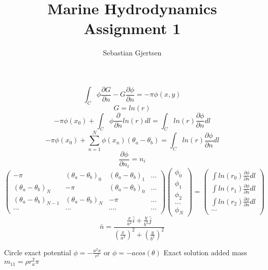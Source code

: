 \documentclass[a4paper,norsk]{article}
\begin{document}
\title{Marine Hydrodynamics \\ Assignment 1}
\author{Sebastian Gjertsen}

\maketitle
\[   \int_C \phi \frac{\partial G }{\partial n} - G\frac{\partial \phi }{\partial n} = -\pi \phi(x,y) \]
\newline
$$ G = ln (r)$$
\newline
$$ -\pi \phi(x_0) + \int_C \phi \frac{\partial }{\partial n} ln(r) dl = \int_C ln(r) \frac{\partial \phi}{\partial n} dl       $$
\newline
\[ -\pi \phi(x_0) + \sum_{n=1}^N \phi(x_n) (\theta_a - \theta_b)  = \int_C ln(r)\frac{\partial \phi }{\partial n} dl    \]
\newline
$$\frac{\partial \phi}{\partial n_i} =n_i $$
\newline
$$
\begin{pmatrix}
  -\pi & (\theta_a - \theta_b)_0  & (\theta_a - \theta_b)_1 & ...\\
  (\theta_a - \theta_b)_N  & -\pi & (\theta_a - \theta_b)_0  & ...\\
  (\theta_a - \theta_b)_{N-1}  & (\theta_a - \theta_b)_N  & -\pi & ...\\
  ... & ... & ....& ...  \\
 \end{pmatrix}
 \begin{pmatrix}
\phi_0  \\
\phi_1 \\
\phi_2 \\ 
  ...  \\
  \phi_N
 \end{pmatrix}
 =
 \begin{pmatrix}
\int ln(r_0)\frac{\partial \phi }{\partial n} dl   \\
\int ln(r_1)\frac{\partial \phi }{\partial n} dl  \\
\int ln(r_2)\frac{\partial \phi }{\partial n} dl  \\ 
  ...  \\
  \end{pmatrix}
  $$
\newline
$$\bar{n} = \frac{\frac{x}{a^2}\bar{i} + \frac{y}{b^2}\bar{j} } { (\frac{x}{a^2})^2 + (\frac{y}{b^2})^2 }$$

\begin{flushleft}
Circle exact potential $\phi =-\frac{a^2x}{r^2} $ or $\phi = -a cos(\theta)$ 
\newline
\newline
Exact solution added mass $m_{11} = \rho r_a^2 \pi $
\end{flushleft}
\end{document}
